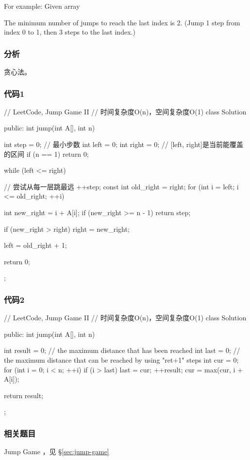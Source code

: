 For example:
Given array 

The minimum number of jumps to reach the last index is 2. (Jump 1 step from index 0 to 1, then 3 steps to the last index.)


\subsubsection{分析}
贪心法。


\subsubsection{代码1}
\begin{Code}
// LeetCode, Jump Game II
// 时间复杂度O(n)，空间复杂度O(1)
class Solution {
public:
    int jump(int A[], int n) {
        int step = 0; // 最小步数
        int left = 0;
        int right = 0;  // [left, right]是当前能覆盖的区间
        if (n == 1) return 0;

        while (left <= right) { // 尝试从每一层跳最远
            ++step;
            const int old_right = right;
            for (int i = left; i <= old_right; ++i) {
                int new_right = i + A[i];
                if (new_right >= n - 1) return step;

                if (new_right > right) right = new_right;
            }
            left = old_right + 1;
        }
        return 0;
    }
};
\end{Code}


\subsubsection{代码2}
\begin{Code}
// LeetCode, Jump Game II
// 时间复杂度O(n)，空间复杂度O(1)
class Solution {
public:
    int jump(int A[], int n) {
        int result = 0;
        // the maximum distance that has been reached
        int last = 0;
        // the maximum distance that can be reached by using "ret+1" steps
        int cur = 0;
        for (int i = 0; i < n; ++i) {
            if (i > last) {
                last = cur;
                ++result;
            }
            cur = max(cur, i + A[i]);
        }

        return result;
    }
};
\end{Code}


\subsubsection{相关题目}
\begindot
\item Jump Game ，见 \S \ref{sec:jump-game}
\myenddot


